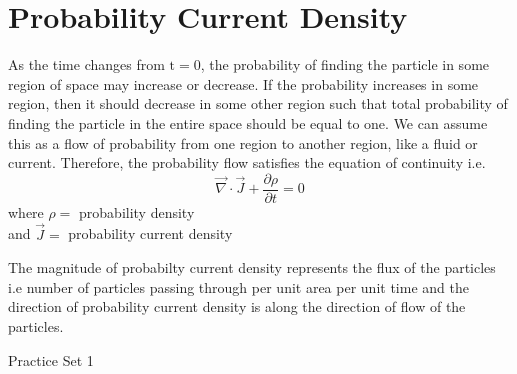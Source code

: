 \section{Probability Current Density}
As the time changes from $\mathrm{t}=0$, the probability of finding the particle in some region of space may increase or decrease. If the probability increases in some region, then it should decrease in some other region such that total probability of finding the particle in the entire space should be equal to one. We can assume this as a flow of probability from one region to another region, like a fluid or current. Therefore, the probability flow satisfies the equation of continuity i.e.
$$
\vec{\nabla} \cdot \vec{J}+\frac{\partial \rho}{\partial t}=0
$$
where $\rho=$ probability density \\
and $\vec{J}=$ probability current density
 \begin{center}
 \end{center}
The magnitude of probabilty current density represents the flux of the particles i.e number of particles passing through per unit area per unit time and the direction of probability current density is along the direction of flow of the particles.\\
\newpage
\begin{abox}
	Practice Set 1
	\end{abox}
